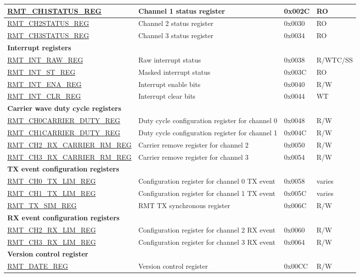 \begin{longtable}{ | p{5.2cm} | p{7.2cm} | p{1.3cm} | p{1.8cm} | }
\hyperref[regdesc:RMTCHNSTATUSREG]{RMT\_CH1STATUS\_REG} & Channel 1 status register & 0x002C & RO \\ \hline
\hyperref[regdesc:RMTCHMSTATUSREG]{RMT\_CH2STATUS\_REG} & Channel 2 status register & 0x0030 & RO \\ \hline
\hyperref[regdesc:RMTCHMSTATUSREG]{RMT\_CH3STATUS\_REG} & Channel 3 status register & 0x0034 & RO \\ \hline
\multicolumn{4}{|l|}{\textbf{Interrupt registers}} \\ \hline
\hyperref[regdesc:RMTINTRAWREG]{RMT\_INT\_RAW\_REG} & Raw interrupt status & 0x0038 & R/WTC/SS \\ \hline
\hyperref[regdesc:RMTINTSTREG]{RMT\_INT\_ST\_REG} & Masked interrupt status & 0x003C & RO \\ \hline
\hyperref[regdesc:RMTINTENAREG]{RMT\_INT\_ENA\_REG} & Interrupt enable bits & 0x0040 & R/W \\ \hline
\hyperref[regdesc:RMTINTCLRREG]{RMT\_INT\_CLR\_REG} & Interrupt clear bits & 0x0044 & WT \\ \hline
\multicolumn{4}{|l|}{\textbf{Carrier wave duty cycle registers}} \\ \hline
\hyperref[regdesc:RMTCHNCARRIERDUTYREG]{RMT\_CH0CARRIER\_DUTY\_REG} & Duty cycle configuration register for channel 0 & 0x0048 & R/W \\ \hline
\hyperref[regdesc:RMTCHNCARRIERDUTYREG]{RMT\_CH1CARRIER\_DUTY\_REG} & Duty cycle configuration register for channel 1 & 0x004C & R/W \\ \hline
\hyperref[regdesc:RMTCHMRXCARRIERRMREG]{RMT\_CH2\_RX\_CARRIER\_RM\_REG} & Carrier remove register for channel 2 & 0x0050 & R/W \\ \hline
\hyperref[regdesc:RMTCHMRXCARRIERRMREG]{RMT\_CH3\_RX\_CARRIER\_RM\_REG} & Carrier remove register for channel 3 & 0x0054 & R/W \\ \hline
\multicolumn{4}{|l|}{\textbf{TX event configuration registers}} \\ \hline
\hyperref[regdesc:RMTCHNTXLIMREG]{RMT\_CH0\_TX\_LIM\_REG} & Configuration register for channel 0 TX event & 0x0058 & varies \\ \hline
\hyperref[regdesc:RMTCHNTXLIMREG]{RMT\_CH1\_TX\_LIM\_REG} & Configuration register for channel 1 TX event & 0x005C & varies \\ \hline
\hyperref[regdesc:RMTTXSIMREG]{RMT\_TX\_SIM\_REG} & RMT TX synchronous register & 0x006C & R/W \\ \hline
\multicolumn{4}{|l|}{\textbf{RX event configuration registers}} \\ \hline
\hyperref[regdesc:RMTCHMRXLIMREG]{RMT\_CH2\_RX\_LIM\_REG} & Configuration register for channel 2 RX event & 0x0060 & R/W \\ \hline
\hyperref[regdesc:RMTCHMRXLIMREG]{RMT\_CH3\_RX\_LIM\_REG} & Configuration register for channel 3 RX event & 0x0064 & R/W \\ \hline
\multicolumn{4}{|l|}{\textbf{Version control register}} \\ \hline
\hyperref[regdesc:RMTDATEREG]{RMT\_DATE\_REG} & Version control register & 0x00CC & R/W \\ \hline
\end{longtable}
